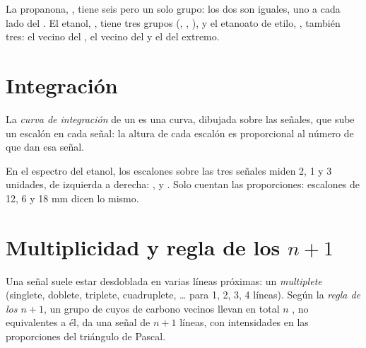 \begin{example}\label{ex:g12:proton-nmr:groups}
La propanona, , tiene seis  pero un solo grupo:
los dos  son iguales, uno a cada lado del . El etanol,
, tiene tres grupos (, , ), y el
etanoato de etilo, , también tres: el 
vecino del , el  vecino del  y el  del
extremo.
\end{example}

\section{Integración}

\begin{definition}\label{def:g12:proton-nmr:integration}
La \emph{curva de integración} de un 
es una curva, dibujada sobre las señales, que sube un escalón en cada
señal: la altura de cada escalón es proporcional al número de 
que dan esa señal.
\end{definition}

\begin{example}\label{ex:g12:proton-nmr:steps}
En el espectro del etanol, los escalones sobre las tres señales miden 2,
1 y 3 unidades, de izquierda a derecha: ,  y .
Solo cuentan las proporciones: escalones de 12, 6 y 18 mm dicen lo mismo.
\end{example}

\section{Multiplicidad y regla de los \texorpdfstring{$n+1$}{n+1}}


\begin{definition}\label{def:g12:proton-nmr:multiplet}
Una señal suele estar desdoblada en varias líneas próximas: un \emph{multiplete}
(singlete, doblete, triplete, cuadruplete, \dots{} para 1, 2, 3, 4 líneas). Según la
\emph{regla de los $n+1$}, un grupo de 
cuyos  de carbono vecinos llevan en total $n$ , no equivalentes
a él, da una señal de $n+1$ líneas, con intensidades en las proporciones del
triángulo de Pascal.
\end{definition}

